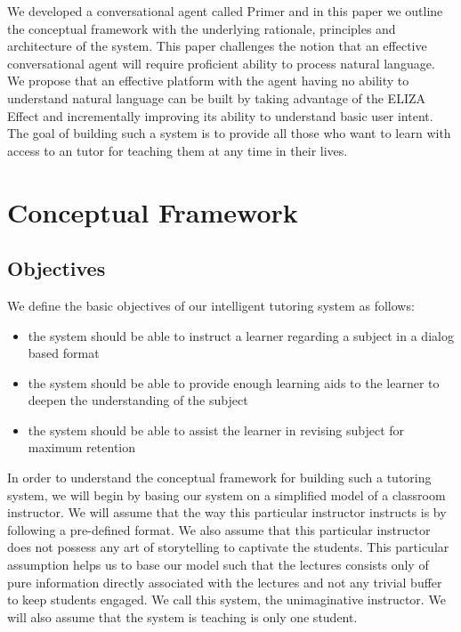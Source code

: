 \documentclass[]{article}
\begin{document}
We developed a conversational agent called Primer and in this paper we outline the conceptual framework with the underlying rationale, principles and architecture of the system. This paper challenges the notion that an effective conversational agent will require proficient ability to process natural language. We propose that an effective platform with the agent having no ability to understand natural language can be built by taking advantage of the ELIZA Effect and incrementally improving its ability to understand basic user intent. The goal of building such a system is to provide all those who want to learn with access to an tutor for teaching them at any time in their lives.  

\section{Conceptual Framework}
\subsection[Objectives]{Objectives}

We define the basic objectives of our intelligent tutoring system as follows:
\begin{itemize}
  
  \item the system should be able to instruct a learner regarding a subject in a dialog based format
  \item the system should be able to provide enough learning aids to the learner to deepen the understanding of the subject
  \item the system should be able to assist the learner in revising subject for maximum retention
\end{itemize} 


In order to understand the conceptual framework for building such a tutoring system, we will begin by basing our system on a simplified model of a classroom instructor. We will assume that the way this particular instructor instructs is by following a pre-defined format. We also assume that this particular instructor does not possess any art of storytelling to captivate the students. This particular assumption helps us to base our model such that the lectures consists only of pure information directly associated with the lectures and not any trivial buffer to keep students engaged. We call this system, the unimaginative instructor. We will also assume that the system is teaching is only one student. 
\end{document}

